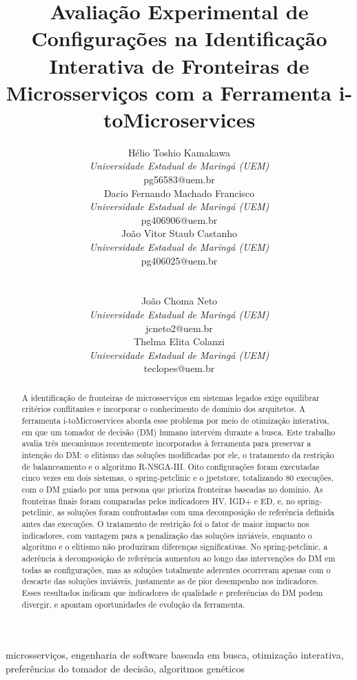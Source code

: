 \documentclass[conference]{IEEEtran}
\makeatletter
\newcommand{\autor}[2]{%
  \begin{tabular}[t]{@{}c@{}}
    {\normalsize #1}\\
    \textit{\small Universidade Estadual de Maringá (UEM)}\\
    {\small #2}
  \end{tabular}}
\newcommand{\itm}{\mbox{i-toMicroservices}}
\makeatother
\begin{document}
\title{Avaliação Experimental de Configurações na Identificação Interativa de Fronteiras de Microsserviços com a Ferramenta \itm{}}

\author{%
\autor{Hélio Toshio Kamakawa}{pg56583@uem.br}\hspace{1.5em}%
\autor{Dacio Fernando Machado Francisco}{pg406906@uem.br}\hspace{1.5em}%
\autor{João Vitor Staub Castanho}{pg406025@uem.br}\\[1.2em]
\autor{João Choma Neto}{jcneto2@uem.br}\hspace{3em}%
\autor{Thelma Elita Colanzi}{teclopes@uem.br}
}

\maketitle

\begin{abstract}
A identificação de fronteiras de microsserviços em sistemas legados exige equilibrar critérios conflitantes e incorporar o conhecimento de domínio dos arquitetos. A ferramenta \itm{} aborda esse problema por meio de otimização interativa, em que um tomador de decisão (DM) humano intervém durante a busca. Este trabalho avalia três mecanismos recentemente incorporados à ferramenta para preservar a intenção do DM: o elitismo das soluções modificadas por ele, o tratamento da restrição de balanceamento e o algoritmo R-NSGA-III. Oito configurações foram executadas cinco vezes em dois sistemas, o spring-petclinic e o jpetstore, totalizando 80 execuções, com o DM guiado por uma persona que prioriza fronteiras baseadas no domínio. As fronteiras finais foram comparadas pelos indicadores HV, IGD+ e ED, e, no spring-petclinic, as soluções foram confrontadas com uma decomposição de referência definida antes das execuções. O tratamento de restrição foi o fator de maior impacto nos indicadores, com vantagem para a penalização das soluções inviáveis, enquanto o algoritmo e o elitismo não produziram diferenças significativas. No spring-petclinic, a aderência à decomposição de referência aumentou ao longo das intervenções do DM em todas as configurações, mas as soluções totalmente aderentes ocorreram apenas com o descarte das soluções inviáveis, justamente as de pior desempenho nos indicadores. Esses resultados indicam que indicadores de qualidade e preferências do DM podem divergir, e apontam oportunidades de evolução da ferramenta.
\end{abstract}

\begin{IEEEkeywords}
microsserviços, engenharia de software baseada em busca, otimização interativa, preferências do tomador de decisão, algoritmos genéticos
\end{IEEEkeywords}
\end{document}
